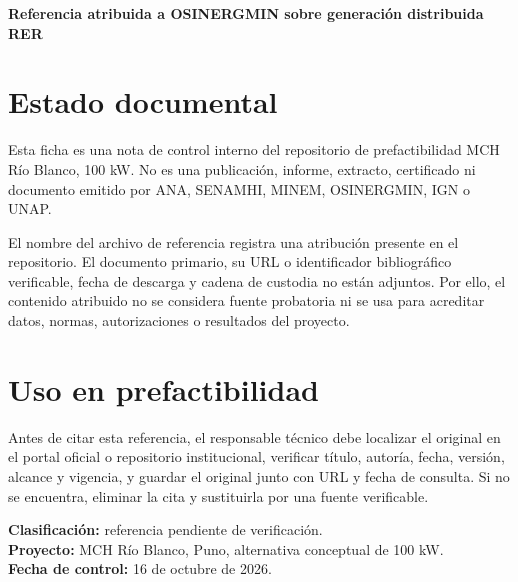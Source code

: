 \documentclass[11pt,a4paper]{article}
\begin{document}
\begin{center}\Large\bfseries\color{navy}Referencia atribuida a OSINERGMIN sobre generación distribuida RER\end{center}
\vspace{1em}
\section*{Estado documental}
Esta ficha es una nota de control interno del repositorio de prefactibilidad MCH Río Blanco, 100 kW. No es una publicación, informe, extracto, certificado ni documento emitido por ANA, SENAMHI, MINEM, OSINERGMIN, IGN o UNAP.

El nombre del archivo de referencia registra una atribución presente en el repositorio. El documento primario, su URL o identificador bibliográfico verificable, fecha de descarga y cadena de custodia no están adjuntos. Por ello, el contenido atribuido no se considera fuente probatoria ni se usa para acreditar datos, normas, autorizaciones o resultados del proyecto.

\section*{Uso en prefactibilidad}
Antes de citar esta referencia, el responsable técnico debe localizar el original en el portal oficial o repositorio institucional, verificar título, autoría, fecha, versión, alcance y vigencia, y guardar el original junto con URL y fecha de consulta. Si no se encuentra, eliminar la cita y sustituirla por una fuente verificable.

\vfill
\noindent\textbf{Clasificación:} referencia pendiente de verificación.\\
\textbf{Proyecto:} MCH Río Blanco, Puno, alternativa conceptual de 100 kW.\\
\textbf{Fecha de control:} 16 de octubre de 2026.
\end{document}
